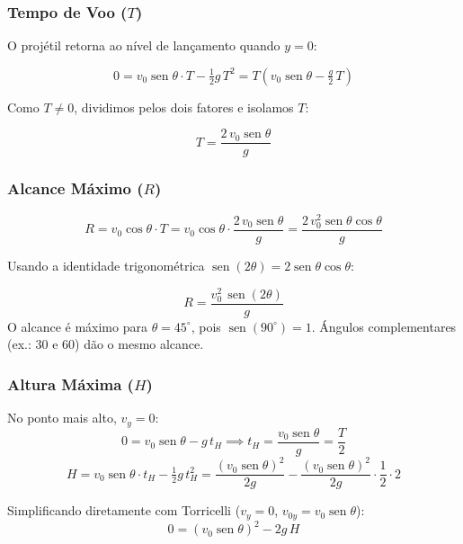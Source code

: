\documentclass[12pt,a4paper]{article}
\begin{document}
\subsubsection*{Tempo de Voo ($T$)}

O proj\'etil retorna ao n\'ivel de lan\c{c}amento quando $y = 0$:

\[
  0 = v_0\operatorname{sen}\theta\cdot T - \tfrac{1}{2}g\,T^2
    = T\!\left(v_0\operatorname{sen}\theta - \tfrac{g}{2}\,T\right)
\]

Como $T \neq 0$, dividimos pelos dois fatores e isolamos $T$:

\begin{tcolorbox}[formulabox={Tempo de Voo}]
  \[
    \boxed{T = \frac{2\,v_0\operatorname{sen}\theta}{g}}
  \]
\end{tcolorbox}

\subsubsection*{Alcance M\'aximo ($R$)}

\[
  R = v_0\cos\theta\cdot T = v_0\cos\theta\cdot
      \frac{2\,v_0\operatorname{sen}\theta}{g}
    = \frac{2\,v_0^2\operatorname{sen}\theta\cos\theta}{g}
\]

Usando a identidade trigonom\'etrica
$\operatorname{sen}(2\theta) = 2\operatorname{sen}\theta\cos\theta$:

\begin{tcolorbox}[formulabox={Alcance}]
  \[
    \boxed{R = \frac{v_0^2\,\operatorname{sen}(2\theta)}{g}}
  \]
  O alcance \'e m\'aximo para $\theta = 45^\circ$,
  pois $\operatorname{sen}(90^\circ) = 1$.
  \'Angulos complementares (ex.: 30\textdegree{} e 60\textdegree{}) d\~ao o mesmo alcance.
\end{tcolorbox}

\subsubsection*{Altura M\'axima ($H$)}

No ponto mais alto, $v_y = 0$:
\[
  0 = v_0\operatorname{sen}\theta - g\,t_H
  \implies t_H = \frac{v_0\operatorname{sen}\theta}{g} = \frac{T}{2}
\]
\[
  H = v_0\operatorname{sen}\theta\cdot t_H - \tfrac{1}{2}g\,t_H^2
    = \frac{(v_0\operatorname{sen}\theta)^2}{2g}
      - \frac{(v_0\operatorname{sen}\theta)^2}{2g}
      \cdot\frac{1}{2} \cdot 2
\]

Simplificando diretamente com Torricelli ($v_y=0$, $v_{0y} = v_0\operatorname{sen}\theta$):
\[
  0 = (v_0\operatorname{sen}\theta)^2 - 2g\,H
\]
\end{document}
